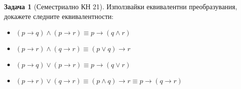 \documentclass[10pt, a4paper]{article}
\theoremstyle{definition}
\newtheorem{problem}{Задача}
\theoremstyle{remark}
\begin{document}
\hfill
\begin{problem}[Семестриално КН 21]  Използвайки еквивалентни преобразувания, докажете следните еквивалентности: 
    \begin{itemize}
        \item \((p \rightarrow q) \wedge (p \rightarrow r) \equiv p \rightarrow (q \wedge r)\)
        \item \((p \rightarrow r) \wedge (q \rightarrow r) \equiv (p \vee q) \rightarrow r\)
        \item \((p \rightarrow q) \vee (p \rightarrow r) \equiv p \rightarrow (q \vee r)\)
        \item \((p \rightarrow r) \vee (q \rightarrow r) \equiv (p \wedge q) \rightarrow r \equiv p \rightarrow (q \rightarrow r)\) 
    \end{itemize}
\end{problem}
\end{document}
